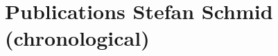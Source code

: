 \documentclass[8pt]{article}
\begin{document}
\section*{Publications Stefan Schmid (chronological)}

\end{document}
